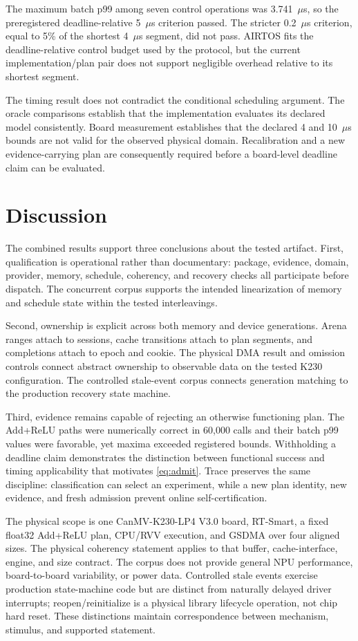 \documentclass[lettersize,journal]{IEEEtran}
\begin{document}
The maximum batch p99 among seven control operations was 3.741~$\mu$s, so the
preregistered deadline-relative 5~$\mu$s criterion passed. The stricter
0.2~$\mu$s criterion, equal to 5\% of the shortest 4~$\mu$s segment, did not
pass. AIRTOS fits the deadline-relative control budget used by the protocol,
but the current implementation/plan pair does not support negligible overhead
relative to its shortest segment.

The timing result does not contradict the conditional scheduling argument.
The oracle comparisons establish that the implementation evaluates its
declared model consistently. Board measurement establishes that the declared
4 and 10~$\mu$s bounds are not valid for the observed physical domain.
Recalibration and a new evidence-carrying plan are consequently required before
a board-level deadline claim can be evaluated.

\section{Discussion}
The combined results support three conclusions about the tested artifact.
First, qualification is operational rather than documentary: package,
evidence, domain, provider, memory, schedule, coherency, and recovery checks all
participate before dispatch. The concurrent corpus supports the intended
linearization of memory and schedule state within the tested interleavings.

Second, ownership is explicit across both memory and device generations.
Arena ranges attach to sessions, cache transitions attach to plan segments,
and completions attach to epoch and cookie. The physical DMA result and
omission controls connect abstract ownership to observable data on the tested
K230 configuration. The controlled stale-event corpus connects generation
matching to the production recovery state machine.

Third, evidence remains capable of rejecting an otherwise functioning plan.
The Add+ReLU paths were numerically correct in 60,000 calls and their batch p99
values were favorable, yet maxima exceeded registered bounds. Withholding a
deadline claim demonstrates the distinction between functional success and
timing applicability that motivates \cref{eq:admit}. Trace preserves the same
discipline: classification can select an experiment, while a new plan identity,
new evidence, and fresh admission prevent online self-certification.

The physical scope is one CanMV-K230-LP4 V3.0 board, RT-Smart, a fixed float32
Add+ReLU plan, CPU/RVV execution, and GSDMA over four aligned sizes. The
physical coherency statement applies to that buffer, cache-interface, engine,
and size contract. The corpus does not provide general NPU performance,
board-to-board variability, or power data. Controlled stale events exercise
production state-machine code but are distinct from naturally delayed driver
interrupts; reopen/reinitialize is a physical library lifecycle operation, not
chip hard reset. These distinctions maintain correspondence between mechanism,
stimulus, and supported statement.
\end{document}
